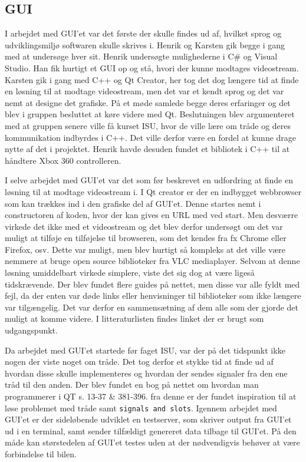 \subsection{GUI}
\label{sec:gui}

I arbejdet med GUI'et var det første der skulle findes ud af, hvilket sprog og udviklingsmiljø softwaren skulle skrives i. Henrik og Karsten gik begge i gang med at undersøge hver sit. Henrik undersøgte mulighederne i C\# og Visual Studio. Han fik hurtigt et GUI op og stå, hvori der kunne modtages videostream. Karsten gik i gang med C++ og Qt Creator, her tog det dog længere tid at finde en løsning til at modtage videostream, men det var et kendt sprog og det var nemt at designe det grafiske. På et møde samlede begge deres erfaringer og det blev i gruppen besluttet at køre videre med Qt. Beslutningen blev argumenteret med at gruppen senere ville få kurset ISU\cite{lib:isu}, hvor de ville lære om tråde og deres kommunikation indbyrdes i C++. Det ville derfor være en fordel at kunne drage nytte af det i projektet. Henrik havde desuden fundet et bibliotek i C++ til at håndtere Xbox 360 controlleren.

I selve arbejdet med GUI'et var det som før beskrevet en udfordring at finde en løsning til at modtage videostream i. I Qt creator er der en indbygget webbrowser som kan trækkes ind i den grafiske del af GUI'et. Denne startes nemt i constructoren af koden, hvor der kan gives en URL med ved start. Men desværre virkede det ikke med et videostream og det blev derfor undersøgt om det var muligt at tilføje en tilføjelse til browseren, som det kendes fra fx Chrome eller Firefox, osv. Dette var muligt, men blev hurtigt så kompleks at det ville være nemmere at bruge open source biblioteker fra VLC mediaplayer. Selvom at denne løsning umiddelbart virkede simplere, viste det sig dog at være ligeså tidskrævende. Der blev fundet flere guides på nettet, men disse var alle fyldt med fejl, da der enten var døde links eller henvisninger til biblioteker som ikke længere var tilgængelig. Det var derfor en sammensætning af dem alle som der gjorde det muligt at komme videre. I litteraturlisten findes linket \cite{lib:vlc-using-qt} der er brugt som udgangspunkt. 

Da arbejdet med GUI'et startede før faget ISU, var der på det tidspunkt ikke nogen der viste noget om tråde. Det tog derfor et stykke tid at finde ud af hvordan disse skulle implementeres og hvordan der sendes signaler fra den ene tråd til den anden. Der blev fundet en bog på nettet om hvordan man programmerer i QT \cite{lib:qt-bog} s. 13-37 \& 381-396. fra denne er der fundet inspiration til at løse problemet med tråde samt \texttt{signals and slots}. Igennem arbejdet med GUI'et er der sideløbende udviklet en testserver, som skriver output fra GUI'et ud i en terminal, samt sender tilfældigt genereret data tilbage til GUI'et. På den måde kan størstedelen af GUI'et testes uden at der nødvendigvis behøver at være forbindelse til bilen. 

